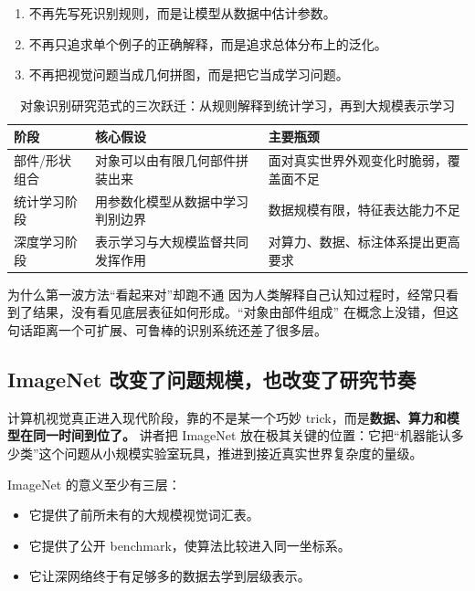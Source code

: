 \begin{enumerate}
    \item 不再先写死识别规则，而是让模型从数据中估计参数。
    \item 不再只追求单个例子的正确解释，而是追求总体分布上的泛化。
    \item 不再把视觉问题当成几何拼图，而是把它当成学习问题。
\end{enumerate}

\begin{table}[H]
\centering
\begin{tabular}{p{3cm}p{4cm}p{5.5cm}}
\toprule
\textbf{阶段} & \textbf{核心假设} & \textbf{主要瓶颈} \\
\midrule
部件/形状组合 & 对象可以由有限几何部件拼装出来 & 面对真实世界外观变化时脆弱，覆盖面不足 \\
统计学习阶段 & 用参数化模型从数据中学习判别边界 & 数据规模有限，特征表达能力不足 \\
深度学习阶段 & 表示学习与大规模监督共同发挥作用 & 对算力、数据、标注体系提出更高要求 \\
\bottomrule
\end{tabular}
\caption{对象识别研究范式的三次跃迁：从规则解释到统计学习，再到大规模表示学习}
\end{table}

\begin{warningbox}{为什么第一波方法``看起来对''却跑不通}
因为人类解释自己认知过程时，经常只看到了结果，没有看见底层表征如何形成。``对象由部件组成'' 在概念上没错，但这句话距离一个可扩展、可鲁棒的识别系统还差了很多层。
\end{warningbox}

\subsection{ImageNet 改变了问题规模，也改变了研究节奏}

计算机视觉真正进入现代阶段，靠的不是某一个巧妙 trick，而是\textbf{数据、算力和模型在同一时间到位了。} 讲者把 ImageNet 放在极其关键的位置：它把``机器能认多少类''这个问题从小规模实验室玩具，推进到接近真实世界复杂度的量级。

ImageNet 的意义至少有三层：

\begin{itemize}
    \item 它提供了前所未有的大规模视觉词汇表。
    \item 它提供了公开 benchmark，使算法比较进入同一坐标系。
    \item 它让深网络终于有足够多的数据去学到层级表示。
\end{itemize}

